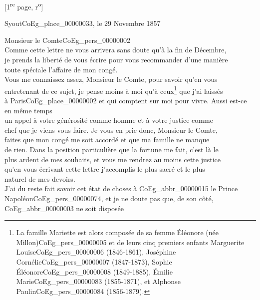 \documentclass{book}
\begin{document}
{{\begin{center} [1\textsuperscript{re} page, r\textsuperscript{o}]\end{center}}

\begin{flushright} Syout\gls{CoEg_place_00000033}, le 29 Novembre 1857
\end{flushright}

\hspace{1cm} Monsieur le Comte\gls{CoEg_pers_00000002}\\

Comme cette lettre ne vous arrivera sans doute qu’à la fin de Décembre,\\
je prends la liberté de vous écrire pour vous recommander d’une manière\\
toute spéciale l’affaire de mon congé.\\
\indent Vous me connaissez assez, Monsieur le Comte, pour savoir qu’en vous\\
entretenant de ce sujet, je pense moins à moi qu’à ceux\footnote{La famille Mariette est alors composée de sa femme Éléonore (née Millon)\gls{CoEg_pers_00000005} et de leurs cinq premiers enfants Marguerite Louise\gls{CoEg_pers_00000006} (1846-1861), Joséphine Cornélie\gls{CoEg_pers_00000007} (1847-1873), Sophie Éléonore\gls{CoEg_pers_00000008} (1849-1885), Émilie Marie\gls{CoEg_pers_00000083} (1855-1871), et Alphonse Paulin\gls{CoEg_pers_00000084} (1856-1879).} que j’ai laissés\\
à Paris\gls{CoEg_place_00000002} et qui comptent sur moi pour vivre. Aussi est-ce en même temps\\
un appel à votre générosité comme homme et à votre justice comme\\
chef que je viens vous faire. Je vous en prie donc, Monsieur le Comte,\\
faites que mon congé me soit accordé et que ma famille ne manque\\
de rien. Dans la position particulière que la fortune me fait, c’est là le\\
plus ardent de mes souhaits, et vous me rendrez au moins cette justice\\
qu’en vous écrivant cette lettre j’accomplis le plus sacré et le plus\\
naturel de mes devoirs.\\
\indent J’ai du reste fait savoir cet état de choses à \gls{CoEg_abbr_00000015} le Prince\\
Napoléon\gls{CoEg_pers_00000074}, et je ne doute pas que, de son côté, \gls{CoEg_abbr_00000003} ne soit disposée\\
}
\end{document}
